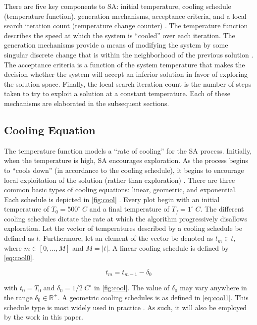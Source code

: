 \documentclass[11pt,a4paper,final]{article}
\newcommand{\Tau}{T}                        %
\begin{document}
There are five key components to SA: initial temperature, cooling schedule (temperature function), generation
mechanisms, acceptance criteria, and a local search iteration count (temperature change counter)
\cite{keller-2019-multi-objec}. The temperature function describes the speed at which the system is ``cooled'' over each
iteration. The generation mechanisms provide a means of modifying the system by some singular discrete change that is
within the neighborhood of the previous solution \cite{gendreau-2018-handb-metah}. The acceptance criteria is a
function of the system temperature that makes the decision whether the system will accept an inferior solution in favor
of exploring the solution space. Finally, the local search iteration count is the number of steps taken to try to
exploit a solution at a constant temperature. Each of these mechanisms are elaborated in the subsequent sections.

\subsection{Cooling Equation}
\label{cooling-equation-experimental}
The temperature function models a ``rate of cooling'' for the SA process. Initially, when the temperature is high, SA
encourages exploration. As the process begins to ``cools down'' (in accordance to the cooling schedule), it begins to
encourage local exploitation of the solution (rather than exploration)
\cite{rutenbar-1989-simul-anneal-algor,henderson-1989-theor-pract}. There are three common basic types of cooling
equations: linear, geometric, and exponential. Each schedule is depicted in \ref{fig:cool} \cite{keller-2019-multi-objec}.
Every plot begin with an initial temperature of \(T_0 = 500^\circ\; C\) and a final temperature of \(T_f = 1^\circ\; C\). The
different cooling schedules dictate the rate at which the algorithm progressively disallows exploration. Let the vector
of temperatures described by a cooling schedule be defined as \(t\). Furthermore, let an element of the vector be denoted
as \(t_m \in t\), where \(m \in [0,...,M]\) and \(M = \lvert t \rvert\). A linear cooling schedule is defined by \ref{eq:cool0}.

\begin{equation}
\label{eq:cool0}
t_m = t_{m-1} - \delta_0
\end{equation}

with \(t_0 = \Tau_0\) and \(\delta_0 = 1/2\; C^\circ\) in \ref{fig:cool}. The value of \(\delta_0\) may vary anywhere in the range \(\delta_0 \in \mathbb{R}^+\). A
geometric cooling schedules is as defined in \ref{eq:cool1}. This schedule type is most widely used in practice
\cite{keller-2019-multi-objec}. As such, it will also be employed by the work in this paper.
\end{document}
